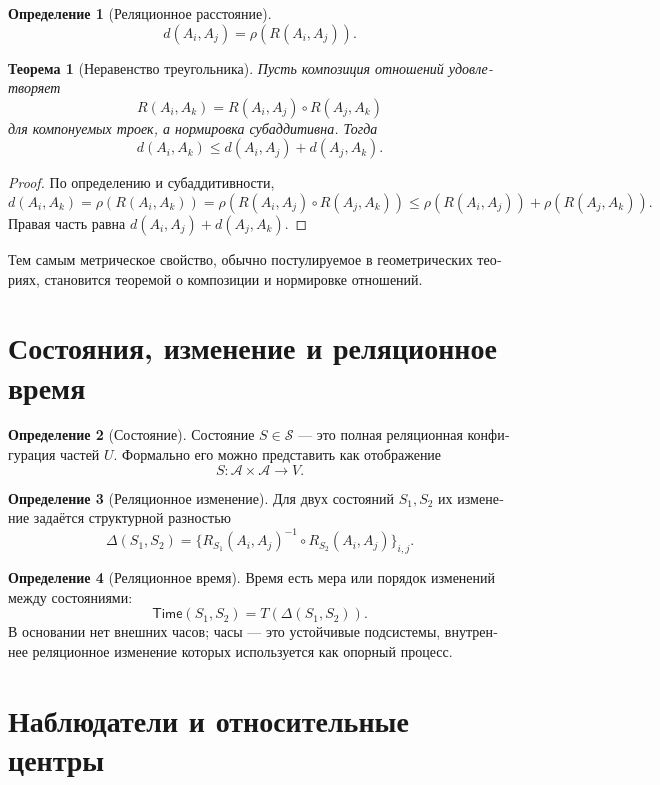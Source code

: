 \documentclass[11pt,a4paper]{article}
\theoremstyle{definition}
\newtheorem{definitionru}{Определение}[section]
\theoremstyle{plain}
\newtheorem{theoremru}{Теорема}[section]
\theoremstyle{remark}
\newcommand{\Whole}{U}
\newcommand{\Parts}{\mathcal A}
\newcommand{\Rel}{R}
\newcommand{\Values}{V}
\newcommand{\State}{S}
\newcommand{\States}{\mathcal S}
\newcommand{\comp}{\circ}
\newcommand{\norm}{\rho}
\newcommand{\Time}{\mathsf{Time}}
\begin{document}
\begin{russian}
\begin{definitionru}[Реляционное расстояние]
\[
d(A_i,A_j)=\norm(\Rel(A_i,A_j)).
\]
\end{definitionru}

\begin{theoremru}[Неравенство треугольника]
Пусть композиция отношений удовлетворяет
\[
\Rel(A_i,A_k)=\Rel(A_i,A_j)\comp\Rel(A_j,A_k)
\]
для компонуемых троек, а нормировка субаддитивна. Тогда
\[
d(A_i,A_k)\leq d(A_i,A_j)+d(A_j,A_k).
\]
\end{theoremru}

\begin{proof}
По определению и субаддитивности,
\[
d(A_i,A_k)=\norm(\Rel(A_i,A_k))
=\norm(\Rel(A_i,A_j)\comp\Rel(A_j,A_k))
\leq \norm(\Rel(A_i,A_j))+\norm(\Rel(A_j,A_k)).
\]
Правая часть равна \(d(A_i,A_j)+d(A_j,A_k)\).
\end{proof}

Тем самым метрическое свойство, обычно постулируемое в геометрических теориях,
становится теоремой о композиции и нормировке отношений.

\section{Состояния, изменение и реляционное время}

\begin{definitionru}[Состояние]
Состояние \(\State\in\States\) — это полная реляционная конфигурация частей
\(\Whole\). Формально его можно представить как отображение
\[
\State:\Parts\times\Parts\to\Values.
\]
\end{definitionru}

\begin{definitionru}[Реляционное изменение]
Для двух состояний \(S_1,S_2\) их изменение задаётся структурной разностью
\[
\Delta(S_1,S_2)=\{\Rel_{S_1}(A_i,A_j)^{-1}\comp \Rel_{S_2}(A_i,A_j)\}_{i,j}.
\]
\end{definitionru}

\begin{definitionru}[Реляционное время]
Время есть мера или порядок изменений между состояниями:
\[
\Time(S_1,S_2)=T(\Delta(S_1,S_2)).
\]
В основании нет внешних часов; часы — это устойчивые подсистемы, внутреннее
реляционное изменение которых используется как опорный процесс.
\end{definitionru}

\section{Наблюдатели и относительные центры}


\end{russian}
\end{document}

